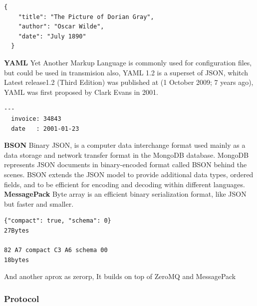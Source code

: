 \begin{lstlisting}[frame=none,numbers=none]
  {
    "title": "The Picture of Dorian Gray",
    "author": "Oscar Wilde",
    "date": "July 1890"
  }
\end{lstlisting}


\noindent \textbf{YAML}
\intro
Yet Another Markup Language is commonly used for configuration files, but could
be used in transmision also, YAML 1.2 is a superset of JSON, whitch Latest release1.2
(Third Edition) was published at (1 October 2009; 7 years ago), YAML was first
proposed by Clark Evans in 2001.

\begin{lstlisting}[frame=none,numbers=none]
  ---
  invoice: 34843
  date   : 2001-01-23
\end{lstlisting}


\noindent \textbf{BSON}
\intro
Binary JSON, is a computer data interchange format used mainly as a data storage
and network transfer format in the MongoDB database.
MongoDB represents JSON documents in binary-encoded format called BSON behind
the scenes. BSON extends the JSON model to provide additional data types,
ordered fields, and to be efficient for encoding and decoding within different languages.
\intro
\noindent \textbf{MessagePack}
\intro
Byte array is an efficient binary serialization format, like JSON but faster and smaller.

\begin{lstlisting}[frame=none,numbers=none]
{"compact": true, "schema": 0}
27Bytes

82 A7 compact C3 A6 schema 00
18bytes
\end{lstlisting}
\noindent And another aprox as zerorp, It builds on top of ZeroMQ and MessagePack

\subsubsection{Protocol}

